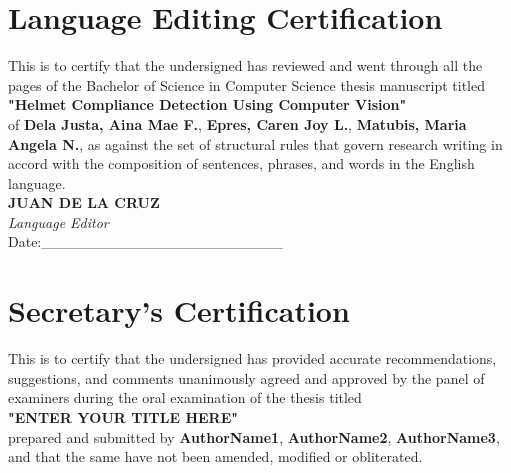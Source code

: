 

\begin{theappendices}

\chapter{Language Editing Certification}
\centering

This is to certify that the undersigned has reviewed and went through all the pages of the Bachelor of Science in Computer Science thesis manuscript titled \\

\textbf{"Helmet Compliance Detection Using Computer Vision"} \\


of \textbf{Dela Justa, Aina Mae F.}, \textbf{Epres, Caren Joy L.}, \textbf{Matubis, Maria Angela N.}, as against the set of structural rules that govern research writing in accord with the composition of sentences, phrases, and words in the English language.
 \newline \newline \newline \\

\noindent \textbf{JUAN DE LA CRUZ} \\
\textit{Language Editor} \\

Date:\_\_\_\_\_\_\_\_\_\_\_\_\_\_\_\_\_\_\_\_\_\_\_


\chapter{Secretary's Certification}
\centering

This is to certify that the undersigned has provided accurate recommendations, suggestions, and comments unanimously agreed and approved by the panel of examiners during the oral examination of the thesis titled \\ \textbf{"ENTER YOUR TITLE HERE"} \\  prepared and submitted by \textbf{AuthorName1}, \textbf{AuthorName2}, \textbf{AuthorName3}, and that the same have not been amended, modified or obliterated. \newline \newline \newline \\




\end{theappendices}
